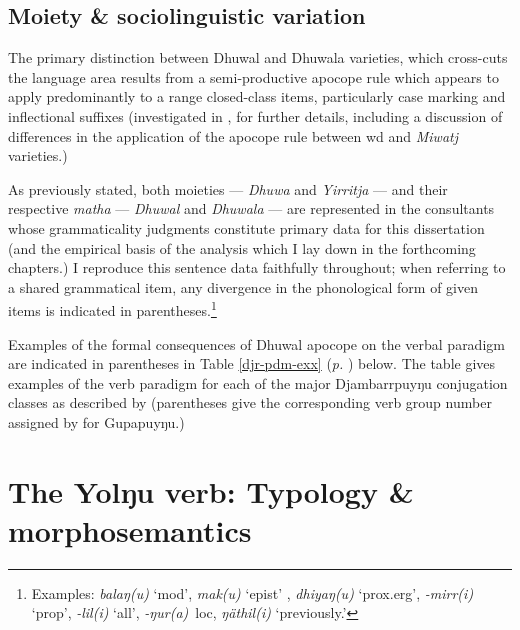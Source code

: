 \subsection*{Moiety \& sociolinguistic variation} 

The  primary distinction between Dhuwal and Dhuwala varieties, which cross-cuts the language area results from a semi-productive apocope rule which appears to apply predominantly to a range closed-class items, particularly case marking and inflectional suffixes (investigated in \citealp{Morphy1977}, \citealp[see also][94\textit{ff}]{Wilkinson1991} for further details, including a discussion of differences in the application of the apocope rule between \gls{wd} and \textit{Miwatj} varieties.)


As previously stated, both moieties --- \textit{Dhuwa} and \textit{Yirritja} --- and their respective \textit{matha} --- \textit{Dhuwal} and \textit{Dhuwala} --- are represented in the consultants whose grammaticality judgments constitute primary data for this dissertation (and the empirical basis of the analysis which I lay down in the forthcoming chapters.) I reproduce this sentence data faithfully throughout; when referring to a shared grammatical item, any divergence in the phonological form of given items is indicated in parentheses.\footnote{Examples: \textit{balaŋ(u)} `\gls{mod}', \textit{mak(u)} `\gls{epist}' 	\label{sec:ym}, \textit{dhiyaŋ(u)} `\gls{prox}.\gls{erg}', \textit{-mirr(i)} `\gls{prop}', \textit{-lil(i)} `\gls{all}', \textit{-ŋur(a)}~\gls{loc}, \textit{ŋäthil(i)} `previously.'}


 Examples of the formal consequences of Dhuwal apocope on the verbal paradigm are indicated in parentheses in Table \ref{djr-pdm-exx} (\textit{p.} \pageref{djr-pdm-exx}) below. The table gives examples of the verb paradigm for each of the major Djambarrpuyŋu conjugation classes as described by \citet[306\textit{ff}]{Wilkinson1991} (parentheses give the corresponding verb group number assigned by \citealt{Lowe1996} for Gupapuyŋu.)




\section{The Yolŋu verb: Typology \& morphosemantics}\label{yol-paradigms}

